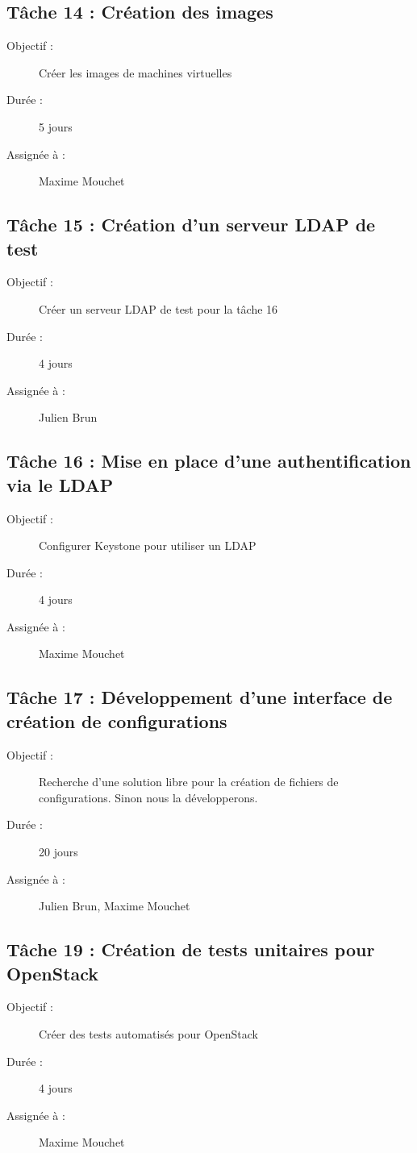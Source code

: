 \documentclass{report}
\begin{document}
\subsection*{Tâche 14 : Création des images}
\begin{description}
\item[Objectif :] Créer les images de machines virtuelles
\item[Durée :]  5 jours
\item[Assignée à :] Maxime Mouchet
\end{description}

\subsection*{Tâche 15 : Création d'un serveur LDAP de test}
\begin{description}
\item[Objectif :] Créer un serveur LDAP de test pour la tâche 16
\item[Durée :]  4 jours
\item[Assignée à :] Julien Brun
\end{description}

\subsection*{Tâche 16 : Mise en place d'une authentification via le LDAP}
\begin{description}
\item[Objectif :] Configurer Keystone pour utiliser un LDAP
\item[Durée :]  4 jours
\item[Assignée à :] Maxime Mouchet
\end{description}

\subsection*{Tâche 17 : Développement d'une interface de création de configurations}
\begin{description}
\item[Objectif :] Recherche d'une solution libre pour la création de fichiers de configurations. Sinon nous la développerons.
\item[Durée :]  20 jours
\item[Assignée à :] Julien Brun, Maxime Mouchet
\end{description}

\subsection*{Tâche 19 : Création de tests unitaires pour OpenStack}
\begin{description}
\item[Objectif :] Créer des tests automatisés pour OpenStack
\item[Durée :]  4 jours
\item[Assignée à :] Maxime Mouchet
\end{description}
\end{document}
